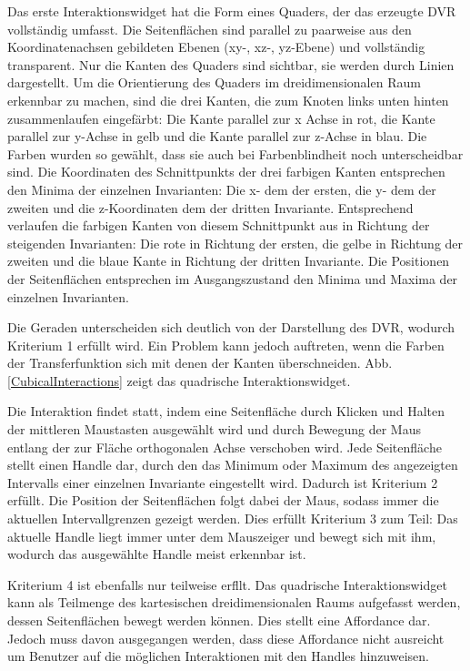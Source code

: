 \documentclass[a4paper,fontsize=12pt,toc=bib,halfparskip]{scrartcl}
\begin{document}
Das erste Interaktionswidget hat die Form eines Quaders, der das erzeugte DVR vollst\"andig umfasst. Die Seitenfl\"achen sind parallel zu paarweise aus den Koordinatenachsen gebildeten Ebenen (xy-, xz-, yz-Ebene) und vollst\"andig transparent. Nur die Kanten des Quaders sind sichtbar, sie werden durch Linien dargestellt. Um die Orientierung des Quaders im dreidimensionalen Raum erkennbar zu machen, sind die drei Kanten, die zum Knoten links unten hinten zusammenlaufen eingef\"arbt: Die Kante parallel zur x Achse in rot, die Kante parallel zur y-Achse in gelb und die Kante parallel zur z-Achse in blau. Die Farben wurden so gew\"ahlt, dass sie auch bei Farbenblindheit noch unterscheidbar sind. Die Koordinaten des Schnittpunkts der drei farbigen Kanten entsprechen den Minima der einzelnen Invarianten: Die x- dem der ersten, die y- dem der zweiten und die z-Koordinaten dem der dritten Invariante. Entsprechend verlaufen die farbigen Kanten von diesem Schnittpunkt aus in Richtung der steigenden Invarianten: Die rote in Richtung der ersten, die gelbe in Richtung der zweiten und die blaue Kante in Richtung der dritten Invariante. Die Positionen der Seitenfl\"achen entsprechen im Ausgangszustand den Minima und Maxima der einzelnen Invarianten. 

Die Geraden unterscheiden sich deutlich von der Darstellung des DVR, wodurch Kriterium 1 erf\"ullt wird. Ein Problem kann jedoch auftreten, wenn die Farben der Transferfunktion sich mit denen der Kanten \"uberschneiden. Abb. \ref{CubicalInteractions} zeigt das quadrische Interaktionswidget.

Die Interaktion findet statt, indem eine Seitenfl\"ache durch Klicken und Halten der mittleren Maustasten ausgew\"ahlt wird und durch Bewegung der Maus entlang der zur Fl\"ache orthogonalen Achse verschoben wird. Jede Seitenfl\"ache stellt einen Handle dar, durch den das Minimum oder Maximum des angezeigten Intervalls einer einzelnen Invariante eingestellt wird. Dadurch ist Kriterium 2 erf\"ullt. Die Position der Seitenfl\"achen folgt dabei der Maus, sodass immer die aktuellen Intervallgrenzen gezeigt werden. Dies erf\"ullt Kriterium 3 zum Teil: Das aktuelle Handle liegt immer unter dem Mauszeiger und bewegt sich mit ihm, wodurch das ausgew\"ahlte Handle meist erkennbar ist. 

Kriterium 4 ist ebenfalls nur teilweise erf\"llt. Das quadrische Interaktionswidget kann als Teilmenge des kartesischen dreidimensionalen Raums aufgefasst werden, dessen Seitenfl\"achen bewegt werden k\"onnen. Dies stellt eine Affordance dar. Jedoch muss davon ausgegangen werden, dass diese Affordance nicht ausreicht um Benutzer auf die m\"oglichen Interaktionen mit den Handles hinzuweisen. 
\end{document}
